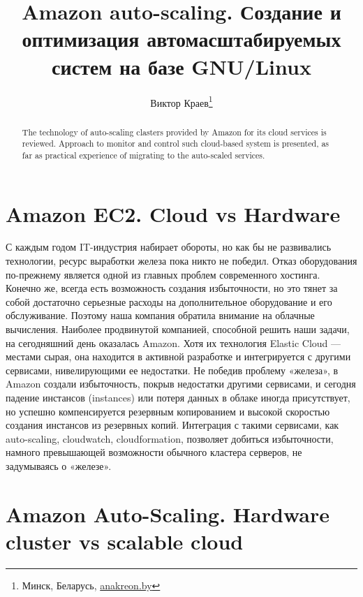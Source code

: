 \documentclass[10pt, a5paper]{article}
\begin{document}
\title{Amazon auto-scaling. Создание и оптимизация автомасштабируемых систем на базе GNU/Linux}
\author{Виктор Краев\footnote{Минск, Беларусь, \url{anakreon.by}}}
\date{}
\maketitle
\begin{abstract}\noindent 
The technology of auto-scaling clasters provided by Amazon for its cloud services is reviewed. Approach to monitor and control such cloud-based system is presented, as far as practical experience of migrating to the auto-scaled services.
\end{abstract}

\section*{Amazon EC2. Cloud vs Hardware}
С каждым годом IT-индустрия набирает обороты, но как бы не развивались технологии, ресурс выработки железа пока никто не победил. Отказ оборудования по-прежнему является одной из главных проблем современного хостинга. Конечно же, всегда есть возможность создания избыточности, но это тянет за собой достаточно серьезные расходы на дополнительное оборудование и его обслуживание. Поэтому наша компания обратила внимание на облачные вычисления. Наиболее продвинутой компанией, способной решить наши задачи, на сегодняшний день оказалась Amazon. Хотя их технология Elastic Cloud --- местами сырая, она находится в активной разработке и интегрируется с другими сервисами, нивелирующими ее недостатки. Не победив проблему «железа», в Amazon создали избыточность, покрыв недостатки другими сервисами, и сегодня падение инстансов (instances) или потеря данных в облаке иногда присутствует, но успешно компенсируется резервным копированием и высокой скоростью создания инстансов из резервных копий. Интеграция с такими сервисами, как auto-scaling, cloudwatch, cloudformation, позволяет добиться избыточности, намного превышающей возможности обычного кластера серверов, не задумываясь о «железе».  

\section*{Amazon Auto-Scaling. Hardware cluster vs scalable cloud}
\end{document}
